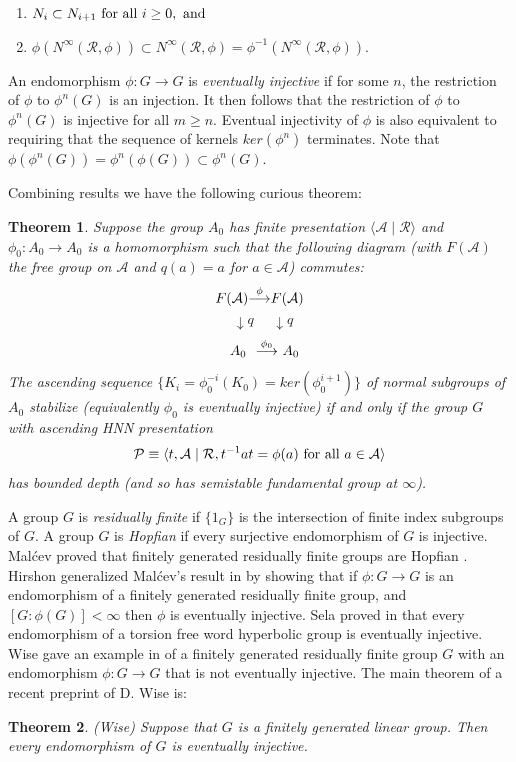 \documentclass[12pt]{article}
\newtheorem{theorem}{Theorem}[subsection]
\begin{document}
\begin{enumerate} 
\item  $N_i\subset N_{i+1} 
\hbox{ for all }i\geq 0,\hbox{ and}$
\item  $\phi(N^{\infty} (\mathcal R,\phi))\subset N^\infty(\mathcal R,\phi)=\phi^{-1}(N^\infty(\mathcal R,\phi)).$
\end{enumerate}

An endomorphism $\phi : G \to G$ is {\it eventually injective} if for
some $n$, the restriction of $\phi$  to $\phi^n(G)$ is an injection.
It then follows that the restriction of $\phi$ to $\phi^n(G)$ is injective for all $m \geq n$.
Eventual injectivity of $\phi$ is also equivalent to requiring that the sequence of
kernels $ker(\phi^n)$ terminates. Note that $\phi(\phi^n(G)) = \phi^n(\phi(G)) \subset \phi^n(G)$.

Combining results we have the following curious theorem:

\begin{theorem} \label{BD} 
Suppose the group $A_0$ has finite presentation $\langle \mathcal A\mid \mathcal R\rangle$ and
$\phi_0:A_0\to  A_0$ is a homomorphism such that the following diagram (with $F({\mathcal A})$ the free group on $\mathcal A$ and $q(a)=a$ for $a\in \mathcal A$) commutes:
$$F(\mathcal A){\buildrel \phi\over \longrightarrow}F(\mathcal A)$$
$$\ \ \downarrow q\ \ \ \ \ \  \downarrow q$$
$$\ \  A_0\ \ {\buildrel \phi_0\over \longrightarrow}\ A_0$$
The ascending sequence $\{K_i=\phi_0^{-i}(K_0)=ker(\phi_0^{i+1})\}$ of normal subgroups of $A_0$ stabilize (equivalently $\phi_0$ is eventually injective) if and only if the group $G$ with ascending HNN presentation 
$$\mathcal P\equiv \langle t,\mathcal A\mid \mathcal R, t^{-1}at=\phi(a) \hbox{ for all }a\in \mathcal A\rangle$$
has bounded depth (and so has semistable fundamental group at $\infty$). 
\end{theorem}

A group $G$ is {\it residually finite} if $\{1_G\}$ is the intersection of finite index
subgroups of $G$. A group $G$ is {\it Hopfian} if every surjective endomorphism
of $G$ is injective. Mal\'cev proved that finitely generated residually finite groups are Hopfian \cite{LS77}. Hirshon generalized Mal\'cev's result in \cite{Hir77} by showing that
if $\phi : G \to  G$ is an endomorphism of a finitely generated residually finite group, and
$[G : \phi (G)] < \infty$ then $\phi$ is eventually injective.  Sela proved in \cite{Sel99} that
every endomorphism of a torsion free word hyperbolic group is eventually
injective. Wise gave an example in \cite{Wise99} of a finitely generated residually finite group $G$
with an endomorphism $\phi : G \to G$ that is not eventually injective. The main theorem of a recent preprint of D. Wise is:
\begin{theorem} (Wise)
Suppose that $G$ is a finitely generated linear group. Then every endomorphism of $G$ is eventually injective. 
\end{theorem}
\end{document}
